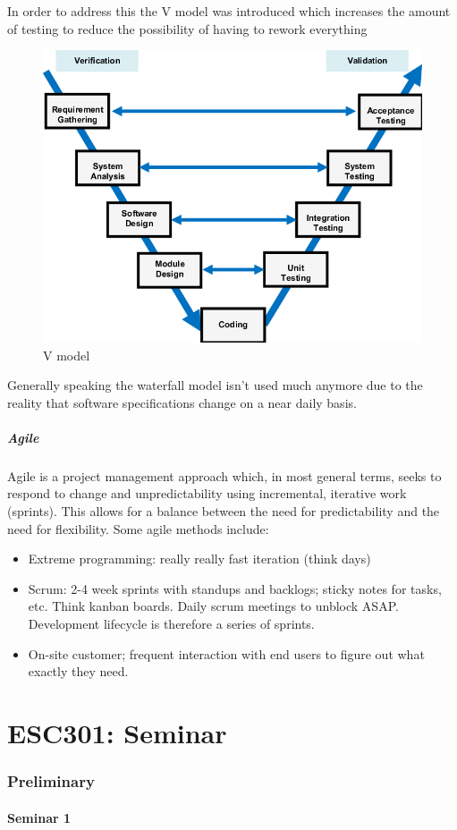 \documentclass[10pt]{article}
\begin{document}
In order to address this the V model was introduced which increases the amount of testing to reduce the possibility of having to rework everything
\begin{figure}[H]
	\centering
	\includegraphics[width=0.8\linewidth]{img/image_2022-09-14-14-36-18.png}
	\caption{V model}
\end{figure}

Generally speaking the waterfall model isn't used much anymore due to the reality that software specifications change on a near daily basis.


\subsubsection{Agile}

Agile is a project management approach which, in most general terms, seeks to respond to change and unpredictability using incremental, iterative work (sprints).
This allows for a balance between the need for predictability and the need for flexibility.
Some agile methods include:
\begin{itemize}
	\item Extreme programming: really really fast iteration (think days)
	\item Scrum: 2-4 week sprints with standups and backlogs; sticky notes for tasks, etc. Think kanban boards. Daily scrum meetings to unblock ASAP. Development lifecycle is therefore a series of sprints.
	\item On-site customer; frequent interaction with end users to figure out what exactly they need.
\end{itemize}






\part{ESC301: Seminar}

\section{Preliminary}
\subsection{Seminar 1}



\end{document}
